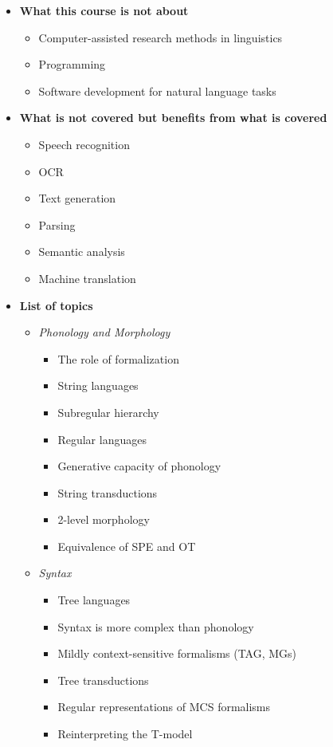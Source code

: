 \begin{itemize}
    \item \textbf{What this course is not about}
        \begin{itemize}
            \item Computer-assisted research methods in linguistics
            \item Programming
            \item Software development for natural language tasks
        \end{itemize}
    \item \textbf{What is not covered but benefits from what is covered}
        \begin{itemize}
            \item Speech recognition
            \item OCR
            \item Text generation
            \item Parsing
            \item Semantic analysis
            \item Machine translation
        \end{itemize}
    \item \textbf{List of topics}
        \begin{itemize}
            \item \emph{Phonology and Morphology}
                \begin{itemize}
                    \item The role of formalization
                    \item String languages
                    \item Subregular hierarchy
                    \item Regular languages
                    \item Generative capacity of phonology
                    \item String transductions
                    \item 2-level morphology
                    \item Equivalence of SPE and OT
                \end{itemize}
            \item \emph{Syntax}
                \begin{itemize}
                    \item Tree languages
                    \item Syntax is more complex than phonology
                    \item Mildly context-sensitive formalisms (TAG, MGs)
                    \item Tree transductions
                    \item Regular representations of MCS formalisms
                    \item Reinterpreting the T-model
                \end{itemize}
        \end{itemize}
\end{itemize}

